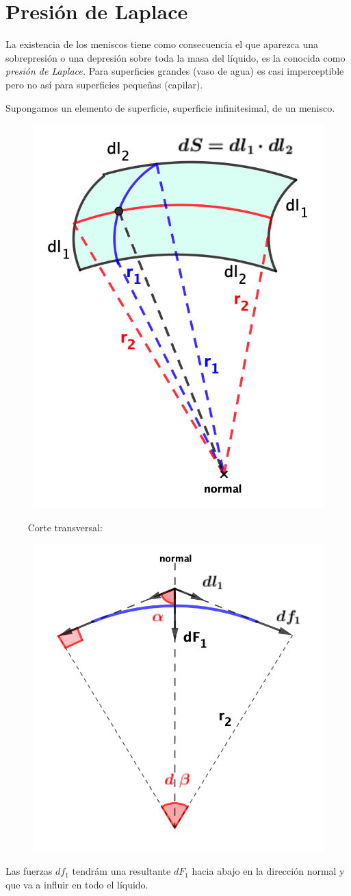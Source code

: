 \vspace{10mm} %

\section{Presión de Laplace}

La existencia de los meniscos tiene como consecuencia el que aparezca una sobrepresión o una depresión sobre toda la masa del líquido, es la conocida como \emph{presión de Laplace.} Para superficies grandes (vaso de agua) es casi imperceptible pero no así para superficies pequeñas (capilar).

Supongamos un elemento de superficie, superficie infinitesimal, de un menisco.

\vspace{40mm} %

\begin{multicols}{2}
\begin{figure}[H]
	\centering
	\includegraphics[width=.45\textwidth]{imagenes/imagenes08/T08IM06.png}
\end{figure}
$\quad \quad$ Corte transversal:

\begin{figure}[H]
	\centering
	\includegraphics[width=.5\textwidth]{imagenes/imagenes08/T08IM07.png}
\end{figure}
\end{multicols}
Las fuerzas $df_1$ tendrám una resultante $dF_1$ hacia abajo en la dirección normal y que va a influir en todo el líquido.

